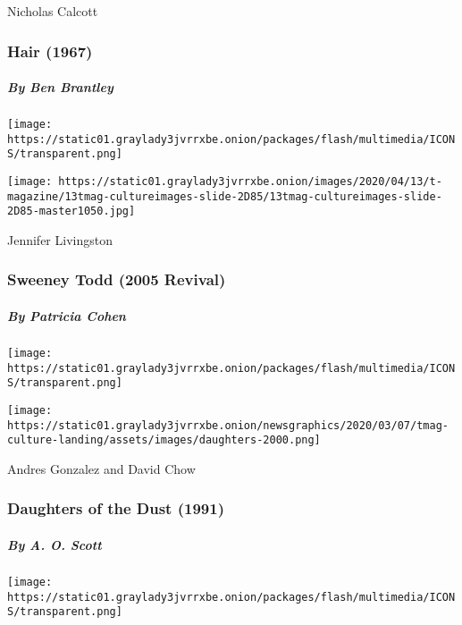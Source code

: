 Nicholas Calcott

\hypertarget{hair-1967}{%
\subsubsection{Hair (1967)}\label{hair-1967}}

\hypertarget{by-ben-brantley}{%
\subparagraph{By Ben Brantley}\label{by-ben-brantley}}

\href{https://www.nytimes3xbfgragh.onion/interactive/2020/04/13/t-magazine/sweeney-todd-revival.html}{}

\texttt{[image: https://static01.graylady3jvrrxbe.onion/packages/flash/multimedia/ICONS/transparent.png]}

\texttt{[image: https://static01.graylady3jvrrxbe.onion/images/2020/04/13/t-magazine/13tmag-cultureimages-slide-2D85/13tmag-cultureimages-slide-2D85-master1050.jpg]}

Jennifer Livingston

\hypertarget{sweeney-todd-2005-revival}{%
\subsubsection{Sweeney Todd (2005
Revival)}\label{sweeney-todd-2005-revival}}

\hypertarget{by-patricia-cohen}{%
\subparagraph{By Patricia Cohen}\label{by-patricia-cohen}}

\href{https://www.nytimes3xbfgragh.onion/interactive/2020/04/13/t-magazine/daughters-of-the-dust.html}{}

\texttt{[image: https://static01.graylady3jvrrxbe.onion/packages/flash/multimedia/ICONS/transparent.png]}

\texttt{[image: https://static01.graylady3jvrrxbe.onion/newsgraphics/2020/03/07/tmag-culture-landing/assets/images/daughters-2000.png]}

Andres Gonzalez and David Chow

\hypertarget{daughters-of-the-dust-1991}{%
\subsubsection{Daughters of the Dust
(1991)}\label{daughters-of-the-dust-1991}}

\hypertarget{by-a-o-scott-1}{%
\subparagraph{By A. O. Scott}\label{by-a-o-scott-1}}

\texttt{[image: https://static01.graylady3jvrrxbe.onion/packages/flash/multimedia/ICONS/transparent.png]}

